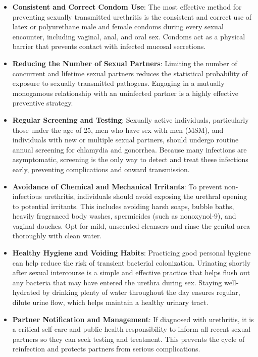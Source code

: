 \begin{itemize}
    \item \textbf{Consistent and Correct Condom Use}: The most effective method for preventing sexually transmitted urethritis is the consistent and correct use of latex or polyurethane male and female condoms during every sexual encounter, including vaginal, anal, and oral sex. Condoms act as a physical barrier that prevents contact with infected mucosal secretions.

    \item \textbf{Reducing the Number of Sexual Partners}: Limiting the number of concurrent and lifetime sexual partners reduces the statistical probability of exposure to sexually transmitted pathogens. Engaging in a mutually monogamous relationship with an uninfected partner is a highly effective preventive strategy.

    \item \textbf{Regular Screening and Testing}: Sexually active individuals, particularly those under the age of 25, men who have sex with men (MSM), and individuals with new or multiple sexual partners, should undergo routine annual screening for chlamydia and gonorrhea. Because many infections are asymptomatic, screening is the only way to detect and treat these infections early, preventing complications and onward transmission.

    \item \textbf{Avoidance of Chemical and Mechanical Irritants}: To prevent non-infectious urethritis, individuals should avoid exposing the urethral opening to potential irritants. This includes avoiding harsh soaps, bubble baths, heavily fragranced body washes, spermicides (such as nonoxynol-9), and vaginal douches. Opt for mild, unscented cleansers and rinse the genital area thoroughly with clean water.

    \item \textbf{Healthy Hygiene and Voiding Habits}: Practicing good personal hygiene can help reduce the risk of transient bacterial colonization. Urinating shortly after sexual intercourse is a simple and effective practice that helps flush out any bacteria that may have entered the urethra during sex. Staying well-hydrated by drinking plenty of water throughout the day ensures regular, dilute urine flow, which helps maintain a healthy urinary tract.

    \item \textbf{Partner Notification and Management}: If diagnosed with urethritis, it is a critical self-care and public health responsibility to inform all recent sexual partners so they can seek testing and treatment. This prevents the cycle of reinfection and protects partners from serious complications.


\end{itemize}
